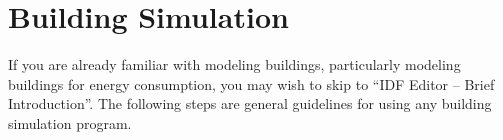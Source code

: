 \section{Building Simulation}\label{building-simulation}

If you are already familiar with modeling buildings, particularly modeling buildings for energy consumption, you may wish to skip to ``IDF Editor -- Brief Introduction''. The following steps are general guidelines for using any building simulation program.
